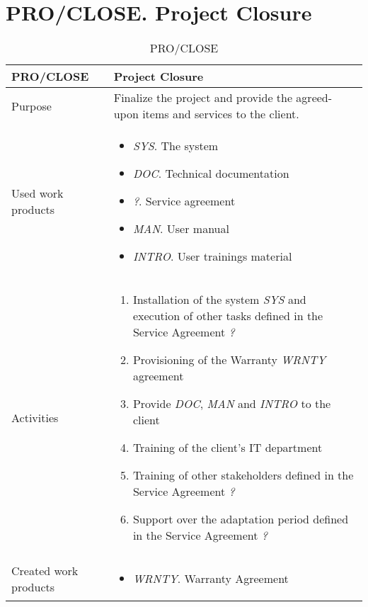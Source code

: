\section{PRO/CLOSE. Project Closure}
\begin{table}[]
\begin{tabular}{l|p{}}
\hline
\textbf{PRO/CLOSE}               & \textbf{Project Closure} \\ \hline
Purpose & Finalize the project and provide the agreed-upon items and services to the client.\\ \hline
Used work products    &      
\begin{itemize}
    \item \textit{SYS}. The system
    \item \textit{DOC}. Technical documentation
    \item \textit{?}. Service agreement
    \item \textit{MAN}. User manual
    \item \textit{INTRO}. User trainings material
\end{itemize}
\\ \hline
Activities            &   
\begin{enumerate}
 \item Installation of the system \textit{SYS} and execution of other tasks defined in the Service Agreement \textit{?}
 \item Provisioning of the Warranty \textit{WRNTY} agreement
 \item Provide \textit{DOC}, \textit{MAN} and \textit{INTRO} to the client
 \item Training of the client's IT department
 \item Training of other stakeholders defined in the Service Agreement \textit{?}
 \item Support over the adaptation period defined in the Service Agreement \textit{?}
\end{enumerate}
\\ \hline
Created work products &     
\begin{itemize}
    \item \textit{WRNTY}. Warranty Agreement
\end{itemize}
\end{tabular}
\caption{PRO/CLOSE}
\label{pro/close}
\end{table}




